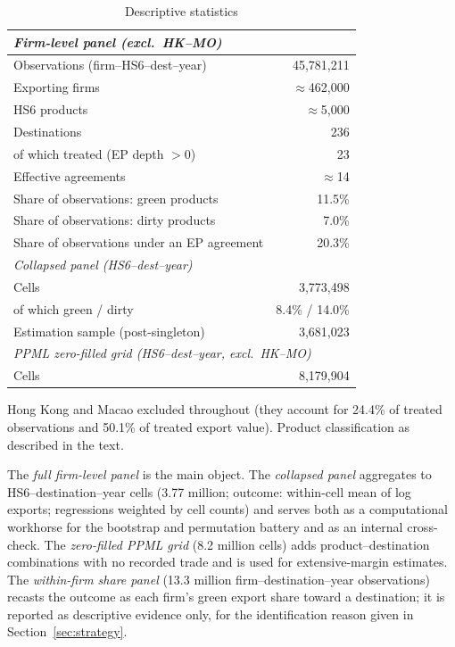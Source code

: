 \documentclass[12pt]{article}
\begin{document}
\begin{table}[htbp]
\centering
\caption{Descriptive statistics}
\label{tab:descriptives}
\small
\begin{threeparttable}
\begin{tabular}{lr}
\toprule
\multicolumn{2}{l}{\textit{Firm-level panel (excl.\ HK--MO)}} \\
\midrule
Observations (firm--HS6--dest--year) & 45{,}781{,}211 \\
Exporting firms & $\approx$462{,}000 \\
HS6 products & $\approx$5{,}000 \\
Destinations & 236 \\
\quad of which treated (EP depth $>0$) & 23 \\
Effective agreements & $\approx$14 \\
Share of observations: green products & 11.5\% \\
Share of observations: dirty products & 7.0\% \\
Share of observations under an EP agreement & 20.3\% \\
\midrule
\multicolumn{2}{l}{\textit{Collapsed panel (HS6--dest--year)}} \\
\midrule
Cells & 3{,}773{,}498 \\
\quad of which green / dirty & 8.4\% / 14.0\% \\
Estimation sample (post-singleton) & 3{,}681{,}023 \\
\midrule
\multicolumn{2}{l}{\textit{PPML zero-filled grid (HS6--dest--year, excl.\ HK--MO)}} \\
\midrule
Cells & 8{,}179{,}904 \\
\bottomrule
\end{tabular}
\begin{tablenotes}\footnotesize
\item Hong Kong and Macao excluded throughout (they account for 24.4\% of treated
observations and 50.1\% of treated export value). Product classification as described
in the text.
\end{tablenotes}
\end{threeparttable}
\end{table}

The \emph{full firm-level panel} is the main object. The \emph{collapsed panel} aggregates
to HS6--destination--year cells (3.77 million; outcome: within-cell mean of log exports;
regressions weighted by cell counts) and serves both as a computational workhorse for the
bootstrap and permutation battery and as an internal cross-check. The
\emph{zero-filled PPML grid} (8.2 million cells) adds product--destination combinations
with no recorded trade and is used for extensive-margin estimates. The \emph{within-firm
share panel} (13.3 million firm--destination--year observations) recasts the outcome as
each firm's green export share toward a destination; it is reported as descriptive
evidence only, for the identification reason given in Section~\ref{sec:strategy}.
\end{document}
